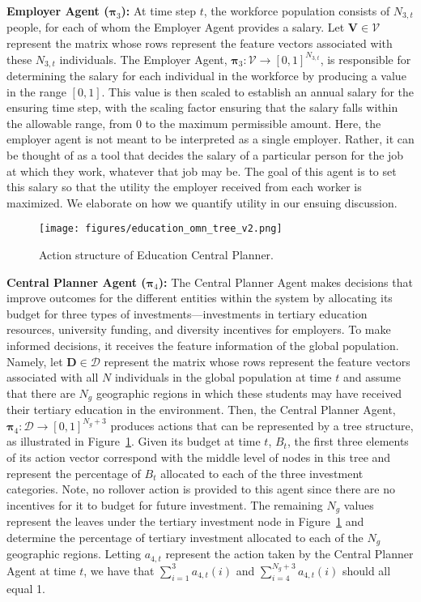 \textbf{Employer Agent ($\boldsymbol{\pi}_3$):} 
At time step $t$, the workforce population consists of $N_{3,t}$ people, for each of whom the Employer Agent provides a salary. Let $\mathbf{V}\in\mathcal{V}$ represent the matrix whose rows represent the feature vectors associated with these $N_{3,t}$ individuals. The Employer Agent, $\boldsymbol{\pi}_3: \mathcal{V} \rightarrow [0,1]^{N_{3,t}}$, is responsible for determining the salary for each individual in the workforce by producing a value in the range $[0,1]$. This value is then scaled to establish an annual salary for the ensuring time step, with the scaling factor ensuring that the salary falls within the allowable range, from 0 to the maximum permissible amount. Here, the employer agent is not meant to be interpreted as a single employer. Rather, it can be thought of as a tool that decides the salary of a particular person for the job at which they work, whatever that job may be. The goal of this agent is to set this salary so that the utility the employer received from each worker is maximized. We elaborate on how we quantify utility in our ensuing discussion.

\begin{figure}[t!]
    \centering
    \texttt{[image: figures/education\_omn\_tree\_v2.png]}
    \caption{Action structure of Education Central Planner.} 
    \label{fig::education_omn_tree_v2}
    \vspace{-0mm}
\end{figure}

\textbf{Central Planner Agent ($\boldsymbol{\pi}_4$):}
The Central Planner Agent makes decisions that improve outcomes for the different entities within the system by allocating its budget for three types of investments---investments in tertiary education resources, university funding, and diversity incentives for employers. To make informed decisions, it receives the feature information of the global population. Namely, let $\mathbf{D}\in\mathcal{D}$ represent the matrix whose rows represent the feature vectors associated with all $N$ individuals in the global population at time $t$ and assume that there are $N_g$ geographic regions in which these students may have received their tertiary education in the environment. Then, the Central Planner Agent, $\boldsymbol{\pi}_4:\mathcal{D}\rightarrow[0,1]^{N_g+3}$ produces actions that can be represented by a tree structure, as illustrated in Figure~\ref{fig::education_omn_tree_v2}. Given its budget at time $t$, $B_t$, the first three elements of its action vector correspond with the middle level of nodes in this tree and represent the percentage of $B_t$ allocated to each of the three investment categories. Note, no rollover action is provided to this agent since there are no incentives for it to budget for future investment. The remaining $N_g$ values represent the leaves under the tertiary investment node in Figure~\ref{fig::education_omn_tree_v2} and determine the percentage of tertiary investment allocated to each of the $N_g$ geographic regions. Letting $a_{4,t}$ represent the action taken by the Central Planner Agent at time $t$, we have that $\sum_{i=1}^{3}a_{4,t}(i)$ and  $\sum_{i=4}^{N_g+3}a_{4,t}(i)$ should all equal 1.

